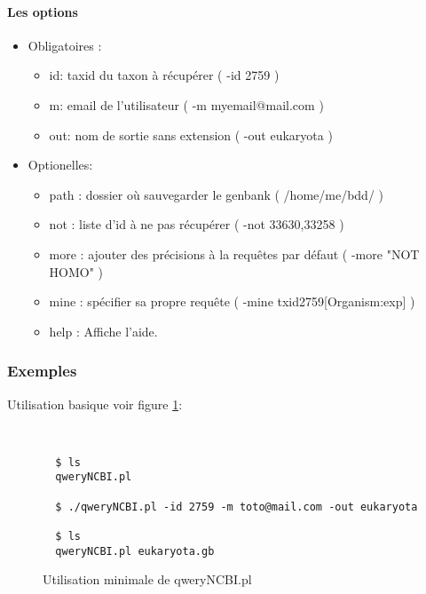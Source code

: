 \paragraph{Les options}
\begin{itemize}
 \item Obligatoires :
\begin{itemize}
 
     \item id: taxid du taxon à récupérer ( -id 2759 )
     \item m: email de l'utilisateur ( -m myemail@mail.com )
    \item out: nom de sortie sans extension ( -out eukaryota )
  \end{itemize}
  \item Optionelles:
  \begin{itemize}
    \item path : dossier où sauvegarder le genbank ( /home/me/bdd/ )
    \item not : liste d'id à ne pas récupérer ( -not 33630,33258 )
    \item more : ajouter des précisions à la requêtes par défaut ( -more "NOT HOMO" )
    \item mine : spécifier sa propre requête ( -mine txid2759[Organism:exp] )
    \item help : Affiche l'aide.
  \end{itemize}
\end{itemize}


\subsubsection{Exemples}

Utilisation basique voir figure \ref{ub}:

~\\
\begin{figure}[H]

\begin{center}
\begin{verbatim}
  $ ls 
  qweryNCBI.pl
  
  $ ./qweryNCBI.pl -id 2759 -m toto@mail.com -out eukaryota
  
  $ ls
  qweryNCBI.pl eukaryota.gb
  \end{verbatim}
\end{center}
\caption{\label{ub}Utilisation minimale de qweryNCBI.pl}
\end{figure}
~\\

